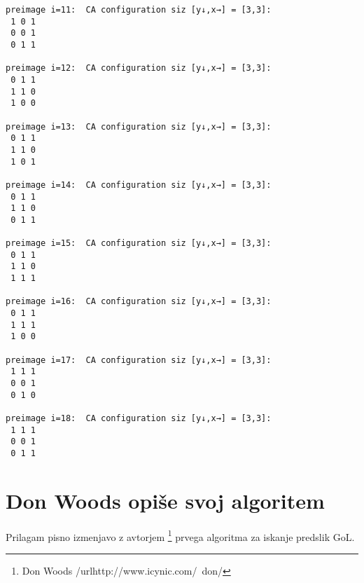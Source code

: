 \documentclass[12pt,a4paper,openany,twoside]{book}
\begin{document}
\begin{verbatim}
preimage i=11:  CA configuration siz [y↓,x→] = [3,3]:
 1 0 1
 0 0 1
 0 1 1

preimage i=12:  CA configuration siz [y↓,x→] = [3,3]:
 0 1 1
 1 1 0
 1 0 0

preimage i=13:  CA configuration siz [y↓,x→] = [3,3]:
 0 1 1
 1 1 0
 1 0 1

preimage i=14:  CA configuration siz [y↓,x→] = [3,3]:
 0 1 1
 1 1 0
 0 1 1

preimage i=15:  CA configuration siz [y↓,x→] = [3,3]:
 0 1 1
 1 1 0
 1 1 1

preimage i=16:  CA configuration siz [y↓,x→] = [3,3]:
 0 1 1
 1 1 1
 1 0 0

preimage i=17:  CA configuration siz [y↓,x→] = [3,3]:
 1 1 1
 0 0 1
 0 1 0

preimage i=18:  CA configuration siz [y↓,x→] = [3,3]:
 1 1 1
 0 0 1
 0 1 1
\end{verbatim}


\chapter{Don Woods opiše svoj algoritem}

Prilagam pisno izmenjavo z avtorjem \footnote{Don Woods /url{http://www.icynic.com/~don/}} prvega algoritma za iskanje predslik GoL.
\end{document}

